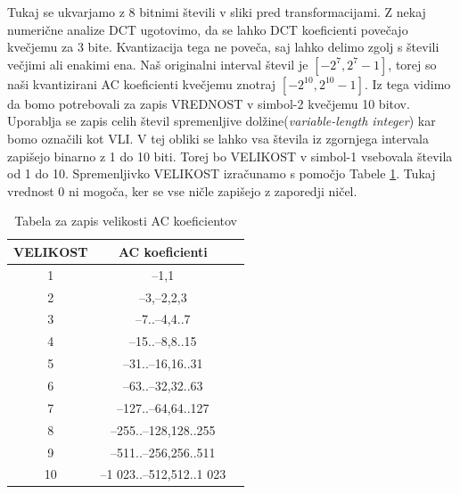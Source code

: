 \documentclass[a4paper,12pt,openright]{book}
\begin{document}
Tukaj se ukvarjamo z 8 bitnimi števili v sliki pred transformacijami. Z nekaj numerične analize DCT ugotovimo, da se lahko DCT koeficienti povečajo kvečjemu za 3 bite. Kvantizacija tega ne poveča, saj lahko delimo zgolj s števili večjimi ali enakimi ena. Naš originalni interval števil je $\left[-2^7,2^7-1\right]$, torej so naši kvantizirani AC koeficienti kvečjemu znotraj $\left[-2^{10},2^{10}-1\right]$. Iz tega vidimo da bomo potrebovali za zapis VREDNOST v simbol-2 kvečjemu 10 bitov. Uporablja se zapis celih števil spremenljive dolžine(\textit{variable-length integer}) kar bomo označili kot VLI. V tej obliki se lahko vsa števila iz zgornjega intervala zapišejo binarno z 1 do 10 biti. Torej bo VELIKOST v simbol-1 vsebovala števila od 1 do 10. Spremenljivko VELIKOST izračunamo s pomočjo Tabele \ref{tab:Velikost_AC}. Tukaj vrednost 0 ni mogoča, ker se vse ničle zapišejo z zaporedji ničel.\par

\begin{table}[ht]
\centering
\begin{tabular}{|c|c|c|}
\hline
VELIKOST& AC koeficienti\\
\hline
 1& –1,1\\
 2& –3,–2,2,3\\
 3& –7..–4,4..7\\
 4& –15..–8,8..15\\
 5& –31..–16,16..31\\
 6& –63..–32,32..63\\
 7& –127..–64,64..127\\
 8& –255..–128,128..255\\
 9& –511..–256,256..511\\
10& –1 023..–512,512..1 023\\
\hline
\end{tabular}
\caption{Tabela za zapis velikosti AC koeficientov}
\label{tab:Velikost_AC}
\end{table}
\end{document}
